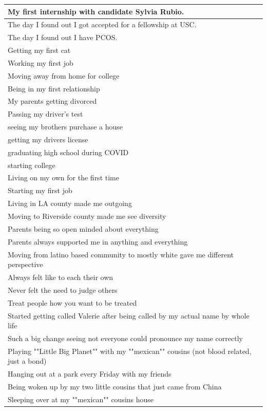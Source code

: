 \documentclass[
  .7em,
  letterpaper,
  DIV=11,
  numbers=noendperiod]{scrartcl}
\begin{document}
\begin{table}
\begin{tabular}{l}
\hline
My first internship with candidate Sylvia Rubio.\\
\hline
The day I found out I got accepted for a fellowship at USC.\\
\hline
The day I found out I have PCOS.\\
\hline
Getting my first cat\\
\hline
Working my first job\\
\hline
Moving away from home for college\\
\hline
Being in my first relationship\\
\hline
My parents getting divorced\\
\hline
Passing my driver's test\\
\hline
seeing my brothers purchase a house\\
\hline
getting my drivers license\\
\hline
graduating high school during COVID\\
\hline
starting college\\
\hline
Living on my own for the first time\\
\hline
Starting my first job\\
\hline
Living in LA county made me outgoing\\
\hline
Moving to Riverside county made me see diversity\\
\hline
Parents being so open minded about everything\\
\hline
Parents always supported me in anything and everything\\
\hline
Moving from latino based community to mostly white gave me different perspective\\
\hline
Always felt like to each their own\\
\hline
Never felt the need to judge others\\
\hline
Treat people how you want to be treated\\
\hline
Started getting called Valerie after being called by my actual name by whole life\\
\hline
Such a big change seeing not everyone could pronounce my name correctly\\
\hline
Playing ""Little Big Planet"" with my ""mexican"" cousins (not blood related, just a bond)\\
\hline
Hanging out at a park every Friday with my friends\\
\hline
Being woken up by my two little cousins that just came from China\\
\hline
Sleeping over at my ""mexican"" cousins house\\

\end{tabular}
\end{table}
\end{document}
